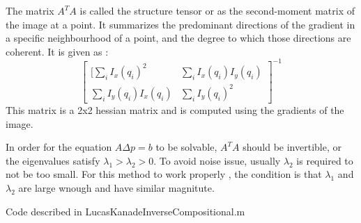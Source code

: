 \documentclass[12pt]{article}
\newenvironment{problem}[2][Problem]{\begin{trivlist}
\item[\hskip \labelsep {\bfseries #1}\hskip \labelsep {\bfseries #2.}]}{\end{trivlist}}
\begin{document}
\begin{problem}{1.1}
The matrix $A^T A$ is called the structure tensor or as the second-moment matrix of the image at a point. It summarizes the predominant directions of the gradient in a specific neighbourhood of a point, and the degree to which those directions are coherent. It is given as :\\

$$
\begin{bmatrix}
[ \sum_i I_x (q_i)^2 & \sum_i I_x (q_i) I_y (q_i) \\
 \sum_i I_y (q_i) I_x (q_i) & \sum_i I_y (q_i)^2
\end{bmatrix} ^{-1}
 $$
 This matrix is a 2x2 hessian matrix and is computed using the gradients of the image.
 
 In order for the equation $A \Delta p = b$ to be solvable, $A^T A$ should be invertible, or the eigenvalues satisfy $\lambda_1 > \lambda_2 > 0$. To avoid noise issue, usually $\lambda_2$ is required to not be too small. For this method to work properly , the condition is that $\lambda_1$ and $\lambda_2$ are large wnough and have similar magnitute.  
 
\end{problem}
\begin{problem}{1.2}
Code described in LucasKanadeInverseCompositional.m \\ 
\end{problem}
\end{document}
